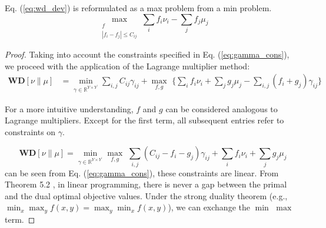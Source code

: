 \begin{lemma}
Eq. (\ref{eq:wd_dev}) is reformulated as a max problem from a min problem.
    \begin{equation}\label{eq:maxmin}
\max_{\substack{f \\ |f_i-f_j| \leq C_{ij}}} \sum_i f_i\nu_i-\sum_{j} f_j\mu_j
\end{equation}

\end{lemma}
\begin{proof}

Taking into account the constraints specified in Eq. (\ref{eq:gamma_cons}), we proceed with the application of the Lagrange multiplier method:
\begin{equation*}\label{cons1}
\begin{aligned}
\textbf{WD}[\nu \| \mu]&=\min_{\gamma \in \mathbb{R}^{Y \times Y^{\prime}}}  \sum_{i,j} C_{ij} \gamma_{ij}+\max_{f, g}\,\,\{ \sum_i f_i \nu_i +\sum_{j} g_j \mu_j-\sum_{i,j}(f_i+g_j) \gamma_{ij}\}
\end{aligned}
\end{equation*}

For a more intuitive understanding, $f$ and $g$ can be considered analogous to Lagrange multipliers.
Except for the first term, all subsequent entries refer to constraints on $\gamma$.

\begin{equation*}
\textbf{WD}[\nu \| \mu]=\min_{\gamma \in \mathbb{R}^{Y \times Y^{\prime}}} \max_{f, g} \,\,\sum_{i,j}(C_{ij}-f_i-g_j) \gamma_{ij}+\sum_i f_i\nu_i+\sum_{j} g_j\mu_j
\end{equation*}
can be seen from Eq. (\ref{eq:gamma_cons}), these constraints are linear. From Theorem 5.2 \citep{vanderbei2020linear}, in linear programming, there is never a gap between the primal and the dual optimal objective values. Under the strong duality theorem (e.g., $\min_x \max_y f(x,y) = \max_y \min_x f(x,y)$), we can exchange the $\min$ $\max$ term.


\end{proof}
